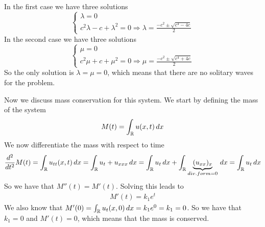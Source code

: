 In the first case we have three solutions
\[
    \begin{cases}
        \lambda = 0 \\
        c^2 \lambda - c + \lambda^2 = 0 \Rightarrow \lambda = \frac{-c^2 \pm \sqrt{c^4 - 4c}}{2}
    \end{cases}
\]
In the second case we have three solutions
\[
    \begin{cases}
        \mu = 0 \\
        c^2 \mu + c + \mu^2 = 0 \Rightarrow \mu = \frac{-c^2 \pm \sqrt{c^4 + 4c}}{2}
    \end{cases}
\]
So the only solution is \(\lambda = \mu = 0\), which means that there are no solitary waves for the problem.

Now we discuss mass conservation for this system. We start by defining the mass of the system
\[
    \begin{split}
        M(t) = \int_{\mathbb{R}} u(x, t) \, dx
    \end{split}
\]
We now differentiate the mass with respect to time
\[
    \begin{split}
        \frac{d^2}{dt^2} M(t) = \int_{\mathbb{R}} u_{tt}(x, t) \, dx = \int_{\mathbb{R}} u_t + u_{xxx} \, dx = \int_{\mathbb{R}} u_t \, dx + \int_{\mathbb{R}} \underbrace{(u_{xx})_x}_{div. form = 0} \, dx = \int_{\mathbb{R}} u_t \, dx
    \end{split}
\]
So we have that \(M''(t) = M'(t)\). Solving this leads to
\[
    \begin{split}
        M'(t) = k_1 e^t
    \end{split}
\]
We also know that \(M'(0) = \int_{\mathbb{R}} u_t(x, 0) \, dx = k_1 e^0 = k_1 = 0\). So we have that \(k_1 = 0\) and \(M'(t) = 0\), which means that the mass is conserved.

